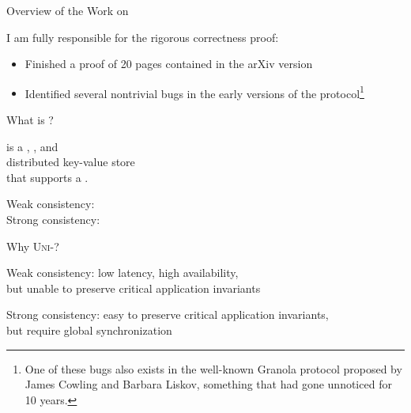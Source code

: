 \begin{frame}{Overview of the Work on \unistore}
  \begin{center}
    \vspace{0.20cm}

    \vspace{1.00cm}
    \noindent I am fully responsible for the rigorous correctness proof: \\[3pt]

    \begin{itemize}
      \item Finished a proof of 20 pages contained in the \textsf{arXiv} version
      \item Identified several nontrivial bugs
            in the early versions of the protocol\footnote{
              One of these bugs also exists in the well-known Granola protocol
              proposed by James Cowling and Barbara Liskov,
              something that had gone unnoticed for 10 years.}
    \end{itemize}
  \end{center}
\end{frame}

\begin{frame}{What is \unistore?}
  \begin{center}
    \unistore{} is a , , and  \\[8pt]
     distributed key-value store \\[8pt]
    that supports a .

    \pause
    \vspace{0.80cm}
    Weak consistency: \cc \\[6pt]
    Strong consistency: \ser
  \end{center}
\end{frame}

\begin{frame}{Why \textsc{Uni-}?}
  \begin{center}
    Weak consistency: low latency, high availability, \\[3pt]
    but unable to preserve critical application invariants


    Strong consistency: easy to preserve critical application invariants, \\[3pt]
    but require global synchronization
  \end{center}
\end{frame}

